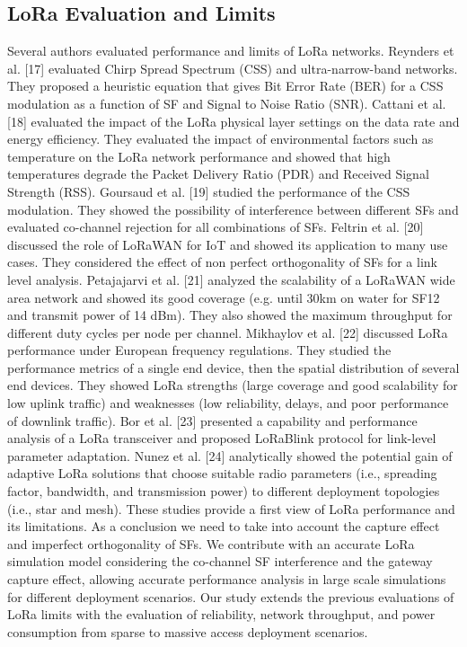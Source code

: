 \subsection{LoRa Evaluation and Limits}
Several authors evaluated performance and limits of LoRa networks.
Reynders et al.
[17] evaluated Chirp Spread Spectrum (CSS) and ultra-narrow-band networks.
They proposed a heuristic equation that gives Bit Error Rate (BER) for a CSS modulation as a function of SF and Signal to Noise Ratio (SNR).
Cattani et al.
[18] evaluated the impact of the LoRa physical layer settings on the data rate and energy efficiency.
They evaluated the impact of environmental factors such as temperature on the LoRa network performance and showed that high temperatures degrade the Packet Delivery Ratio (PDR) and Received Signal Strength (RSS).
Goursaud et al.
[19] studied the performance of the CSS modulation.
They showed the possibility of interference between different SFs and evaluated co-channel rejection for all combinations of SFs.
Feltrin et al.
[20] discussed the role of LoRaWAN for IoT and showed its application to many use cases.
They considered the effect of non perfect orthogonality of SFs for a link level analysis.
Petajajarvi et al.
[21] analyzed the scalability of a LoRaWAN wide area network and showed its good coverage (e.g.
until 30km on water for SF12 and transmit power of 14 dBm).
They also showed the maximum throughput for different duty cycles per node per channel.
Mikhaylov et al.
[22] discussed LoRa performance under European frequency regulations.
They studied the performance metrics of a single end device,
	then the spatial distribution of several end devices.
They showed LoRa strengths (large coverage and good scalability for low uplink traffic) and weaknesses (low reliability,
	delays,
	and poor performance of downlink traffic).
Bor et al.
[23] presented a capability and performance analysis of a LoRa transceiver and proposed LoRaBlink protocol for link-level parameter adaptation.
Nunez et al.
[24] analytically showed the potential gain of adaptive LoRa solutions that choose suitable radio parameters (i.e.,
	spreading factor,
	bandwidth,
	and transmission power) to different deployment topologies (i.e.,
	star and mesh).
These studies provide a first view of LoRa performance and its limitations.
As a conclusion we need to take into account the capture effect and imperfect orthogonality of SFs.
We contribute with an accurate LoRa simulation model considering the co-channel SF interference and the gateway capture effect,
	allowing accurate performance analysis in large scale simulations for different deployment scenarios.
Our study extends the previous evaluations of LoRa limits with the evaluation of reliability,
	network throughput,
	and power consumption from sparse to massive access deployment scenarios.

